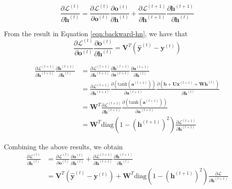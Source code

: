 \documentclass{article}
\begin{document}
	$$ \frac{\partial \mathcal{L}^{(t)}}{\partial \bm{h}^{(t)}}
		= \frac{\partial \mathcal{L}^{(t)}}{\partial \bm{o}^{(t)}} \frac{\partial \bm{o}^{(t)}}{\partial \bm{h}^{(t)}}
		+ \frac{\partial \mathcal{L}^{(t+1)}}{\partial \bm{h}^{(t+1)}} \frac{\partial \bm{h}^{(t+1)}}{\partial \bm{h}^{(t)}} $$

From the result in Equation \ref{eqn:backward-hn}, we have that
	$$ \frac{\partial \mathcal{L}^{(t)}}{\partial \bm{o}^{(t)}} \frac{\partial \bm{o}^{(t)}}{\partial \bm{h}^{(t)}}
		 = \bm{V}^T(\hat{\bm{y}}^{(t)} - \bm{y}^{(t)}) $$

\begin{equation*}
\begin{split}
	\frac{\partial \mathcal{L}^{(t+1)}}{\partial \bm{h}^{(t+1)}} \frac{\partial \bm{h}^{(t+1)}}{\partial \bm{h}^{(t)}}
		&= \frac{\partial \mathcal{L}^{(t+1)}}{\partial \bm{h}^{(t+1)}} \frac{\partial \bm{h}^{(t+1)}}{\partial \bm{a}^{(t+1)}} \frac{\partial \bm{a}^{(t+1)}}{\partial \bm{h}^{(t)}} \\
		&= \frac{\partial \mathcal{L}^{(t+1)}}{\partial \bm{h}^{(t+1)}} \frac{\partial( \text{tanh}(\bm{a}^{(t+1)}))}{\partial \bm{a}^{(t+1)}} \frac{\partial (\bm{b} + \bm{U}\bm{x}^{(t+1)} + \bm{W}\bm{h}^{(t)})}{\partial \bm{h}^{(t)}} \\
		&= \bm{W}^T \frac{\partial \mathcal{L}^{(t+1)}}{\partial \bm{h}^{(t+1)}} \frac{\partial( \text{tanh}(\bm{a}^{(t+1)}))}{\partial \bm{a}^{(t+1)}} \\
		&= \bm{W}^T \text{diag}(1 - (\bm{h}^{(t+1)})^2) \frac{\partial \mathcal{L}^{(t+1)}}{\partial \bm{h}^{(t+1)}}
\end{split}
\end{equation*}

Combining the above results, we obtain
\begin{equation}
\label{eqn:backward-ht}
\begin{split}
	\frac{\partial \mathcal{L}^{(t)}}{\partial \bm{h}^{(t)}}
		&= \frac{\partial \mathcal{L}^{(t)}}{\partial \bm{o}^{(t)}} \frac{\partial \bm{o}^{(t)}}{\partial \bm{h}^{(t)}} 
			+ \frac{\partial \mathcal{L}^{(t+1)}}{\partial \bm{h}^{(t+1)}} \frac{\partial \bm{h}^{(t+1)}}{\partial \bm{h}^{(t)}} \\
		&= \bm{V}^T(\hat{\bm{y}}^{(t)} - \bm{y}^{(t)}) + \bm{W}^T \text{diag}(1 - (\bm{h}^{(t+1)})^2) \frac{\partial \mathcal{L}}{\partial \bm{h}^{(t+1)}}
\end{split}
\end{equation}\\
\end{document}

